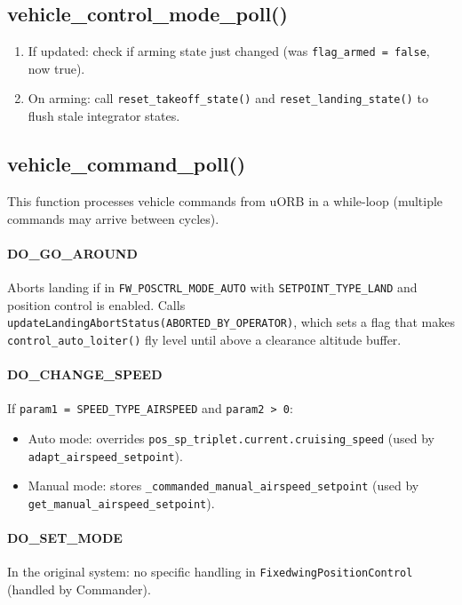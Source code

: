 \documentclass[12pt,a4paper]{article}
\begin{document}
\subsection{vehicle\_control\_mode\_poll()}

\begin{enumerate}
  \item If updated: check if arming state just changed
        (was \texttt{flag\_armed = false}, now true).
  \item On arming: call \texttt{reset\_takeoff\_state()} and
        \texttt{reset\_landing\_state()} to flush stale integrator states.
\end{enumerate}

\subsection{vehicle\_command\_poll()}

This function processes vehicle commands from uORB in a while-loop (multiple
commands may arrive between cycles).

\paragraph{DO\_GO\_AROUND}
Aborts landing if in \texttt{FW\_POSCTRL\_MODE\_AUTO} with
\texttt{SETPOINT\_TYPE\_LAND} and position control is enabled.
Calls \texttt{updateLandingAbortStatus(ABORTED\_BY\_OPERATOR)}, which
sets a flag that makes \texttt{control\_auto\_loiter()} fly level
until above a clearance altitude buffer.

\paragraph{DO\_CHANGE\_SPEED}
If \texttt{param1 = SPEED\_TYPE\_AIRSPEED} and \texttt{param2 > 0}:
\begin{itemize}
  \item Auto mode: overrides \texttt{pos\_sp\_triplet.current.cruising\_speed}
        (used by \texttt{adapt\_airspeed\_setpoint}).
  \item Manual mode: stores \texttt{\_commanded\_manual\_airspeed\_setpoint}
        (used by \texttt{get\_manual\_airspeed\_setpoint}).
\end{itemize}

\paragraph{DO\_SET\_MODE}
In the original system: no specific handling in
\texttt{FixedwingPositionControl} (handled by Commander).
\end{document}
